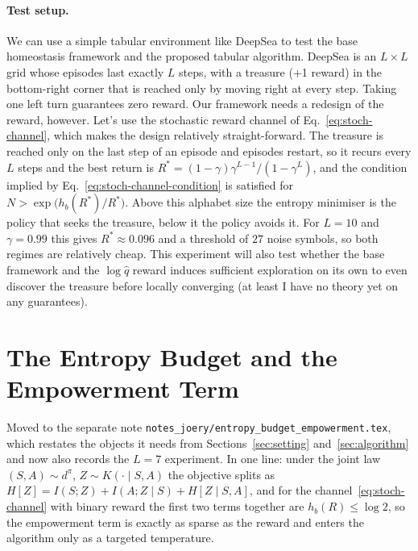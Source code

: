 \documentclass[11pt]{article}
\theoremstyle{remark}
\newcommand{\1}{\mathds{1}}
\newcommand{\occ}{d^{\pi}}
\newcommand{\Hf}[1]{H\!\left[#1\right]}
\newcommand{\new}[1]{\textcolor{blue!70!black}{#1}}
\newcommand{\fix}[1]{\textcolor{red!75!black}{#1}}
\begin{document}
\paragraph{Test setup.}
We can use a simple tabular environment like DeepSea to test the base homeostasis framework and the proposed tabular algorithm.
DeepSea is an $L\times L$ grid whose episodes last exactly $L$ steps, with a treasure (+1 reward) in the bottom-right corner that is reached only by moving right at every step.
Taking one left turn guarantees zero reward.
Our framework needs a redesign of the reward, however.
Let's use the stochastic reward channel of Eq.~\eqref{eq:stoch-channel}, which makes the design relatively straight-forward.
The treasure is reached only on the last step of an episode \new{and episodes restart, so it recurs every $L$ steps and the best return is $R^\ast=(1-\gamma)\gamma^{L-1}/(1-\gamma^L)$}, and the condition implied by Eq.~\eqref{eq:stoch-channel-condition} is satisfied for $N>\exp\big(h_b(R^\ast)/R^\ast\big)$.
Above this alphabet size the entropy minimiser is the policy that seeks the treasure, below it the policy avoids it.
\new{For $L=10$ and $\gamma=0.99$ this gives $R^\ast\approx0.096$ and a threshold of $27$ noise symbols, so both regimes are relatively cheap.}
This experiment will also test whether the base framework and the $\log\hat q$ reward induces sufficient exploration on its own to even discover the treasure before locally converging (at least I have no theory yet on any guarantees).




\section{The Entropy Budget and the Empowerment Term}
\label{sec:budget}

\fix{Moved to the separate note \texttt{notes\_joery/entropy\_budget\_empowerment.tex}, which restates the objects it needs from Sections~\ref{sec:setting} and~\ref{sec:algorithm} and now also records the $L=7$ experiment.
In one line: under the joint law $(S,A)\sim\occ$, $Z\sim K(\cdot\mid S,A)$ the objective splits as $\Hf{Z}=I(S;Z)+I(A;Z\mid S)+\Hf{Z\mid S,A}$, and for the channel~\eqref{eq:stoch-channel} with binary reward the first two terms together are $h_b(R)\le\log2$, so the empowerment term is exactly as sparse as the reward and enters the algorithm only as a targeted temperature.}

\end{document}
